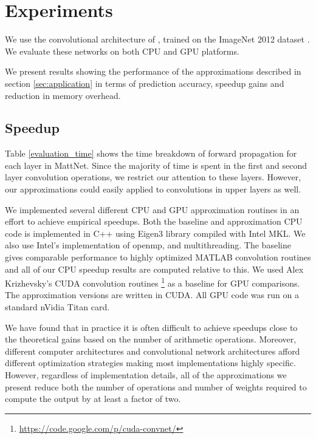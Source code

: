 \section{Experiments}\label{sec:experiments}

We use the convolutional architecture of \cite{zeiler2013visualizing}, trained on the
ImageNet 2012 dataset \cite{imagenet}.
We evaluate these networks on both CPU and GPU platforms. 

We present results showing the performance of the approximations described in section \ref{sec:application} in terms of prediction accuracy, speedup gains and reduction in memory overhead. 

\vspace{-0.3cm}
\subsection{Speedup}
Table \ref{evaluation_time} shows the time breakdown of forward
propagation for each layer in MattNet. Since the majority of time is spent
in the first and second layer convolution operations, we restrict our
attention to these layers. However, our approximations could easily
applied to convolutions in upper layers as well.

We implemented several different CPU and GPU approximation routines 
in an effort to achieve empirical
speedups. Both the baseline and approximation CPU code is implemented
in C++ using Eigen3 library \cite{eigenweb} compiled with Intel MKL.
We also use Intel's implementation of openmp, and multithreading. The
baseline gives comparable performance to highly optimized MATLAB
convolution routines and all of our CPU speedup results are computed
relative to this.  We used Alex Krizhevsky's CUDA convolution routines
\footnote{\url{https://code.google.com/p/cuda-convnet/}} as a baseline for GPU
comparisons. The approximation versions are written in CUDA. All GPU
code was run on a standard nVidia Titan card.

We have found that in practice it is often difficult to achieve
speedups close to the theoretical gains based on the number of
arithmetic operations.
Moreover, different computer architectures and convolutional network
architectures afford different optimization strategies making most
implementations highly specific.  However, regardless of
implementation details, all of the approximations we present reduce
both the number of operations and number of weights required to
compute the output by at least a factor of two.  

